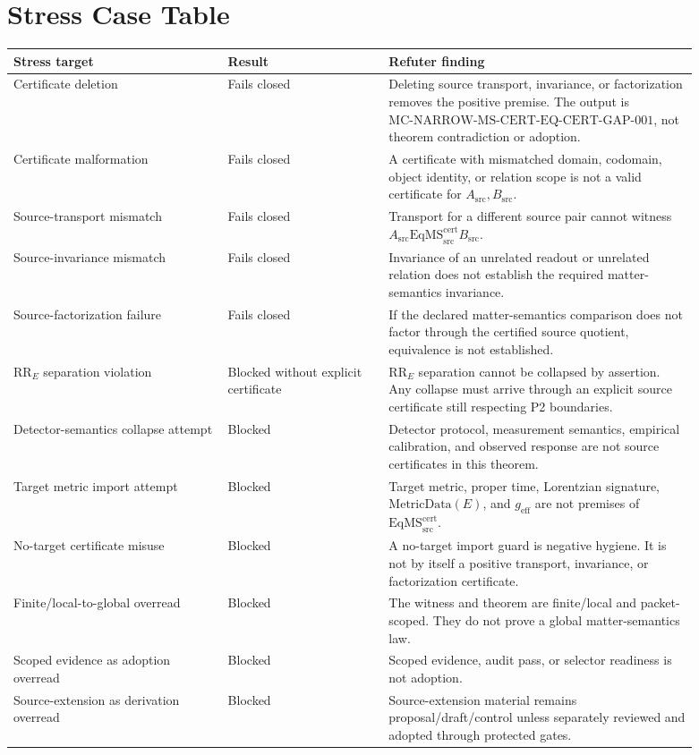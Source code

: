 \documentclass[11pt]{article}
\newcommand{\EqMScert}{\mathrm{EqMS}^{\mathrm{cert}}_{\mathrm{src}}}
\newcommand{\Asrc}{A_{\mathrm{src}}}
\newcommand{\Bsrc}{B_{\mathrm{src}}}
\newcommand{\RRE}{\mathrm{RR}_{E}}
\newcommand{\MetricData}{\mathrm{MetricData}}
\newcommand{\geff}{g_{\mathrm{eff}}}
\newcommand{\WitnessId}{\mathrm{MC}\text{-}\mathrm{NARROW}\text{-}\mathrm{MS}\text{-}\mathrm{CERT}\text{-}\mathrm{EQ}\text{-}\mathrm{CERT}\text{-}\mathrm{GAP}\text{-}001}
\begin{document}
\section{Stress Case Table}

\begin{longtable}{p{0.28\linewidth}p{0.21\linewidth}p{0.40\linewidth}}
\toprule
Stress target & Result & Refuter finding \\
\midrule
Certificate deletion &
Fails closed &
Deleting source transport, invariance, or factorization removes the positive
premise. The output is \(\WitnessId\), not theorem contradiction or adoption. \\
Certificate malformation &
Fails closed &
A certificate with mismatched domain, codomain, object identity, or relation
scope is not a valid certificate for \(\Asrc,\Bsrc\). \\
Source-transport mismatch &
Fails closed &
Transport for a different source pair cannot witness \(\Asrc \EqMScert \Bsrc\). \\
Source-invariance mismatch &
Fails closed &
Invariance of an unrelated readout or unrelated relation does not establish
the required matter-semantics invariance. \\
Source-factorization failure &
Fails closed &
If the declared matter-semantics comparison does not factor through the
certified source quotient, equivalence is not established. \\
\(\RRE\) separation violation &
Blocked without explicit certificate &
\(\RRE\) separation cannot be collapsed by assertion. Any collapse must arrive
through an explicit source certificate still respecting P2 boundaries. \\
Detector-semantics collapse attempt &
Blocked &
Detector protocol, measurement semantics, empirical calibration, and observed
response are not source certificates in this theorem. \\
Target metric import attempt &
Blocked &
Target metric, proper time, Lorentzian signature, \(\MetricData(E)\), and
\(\geff\) are not premises of \(\EqMScert\). \\
No-target certificate misuse &
Blocked &
A no-target import guard is negative hygiene. It is not by itself a positive
transport, invariance, or factorization certificate. \\
Finite/local-to-global overread &
Blocked &
The witness and theorem are finite/local and packet-scoped. They do not prove
a global matter-semantics law. \\
Scoped evidence as adoption overread &
Blocked &
Scoped evidence, audit pass, or selector readiness is not adoption. \\
Source-extension as derivation overread &
Blocked &
Source-extension material remains proposal/draft/control unless separately
reviewed and adopted through protected gates. \\
\bottomrule
\end{longtable}
\end{document}
